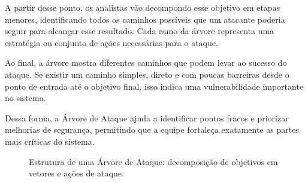 \documentclass[12pt,a4paper,twoside]{report}
\begin{document}
A partir desse ponto, os analistas vão decompondo esse objetivo em etapas menores, identificando todos os caminhos possíveis que um atacante poderia seguir para alcançar esse resultado. Cada ramo da árvore representa uma estratégia ou conjunto de ações necessárias para o ataque.

Ao final, a árvore mostra diferentes caminhos que podem levar ao sucesso do ataque. Se existir um caminho simples, direto e com poucas barreiras desde o ponto de entrada até o objetivo final, isso indica uma vulnerabilidade importante no sistema.

Dessa forma, a Árvore de Ataque ajuda a identificar pontos fracos e priorizar melhorias de segurança, permitindo que a equipe fortaleça exatamente as partes mais críticas do sistema.
\begin{figure}[h]
    \centering
    \caption{Estrutura de uma Árvore de Ataque: decomposição de objetivos em vetores e ações de ataque.} \label{fig:arvore_ataque}
\end{figure}
\end{document}
